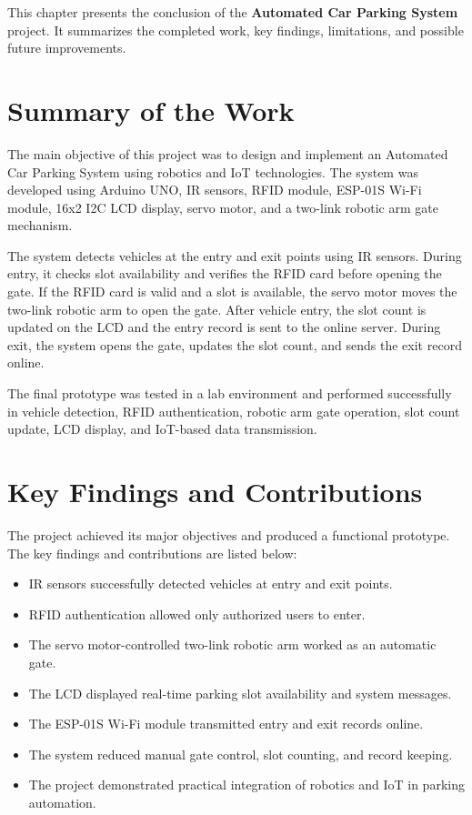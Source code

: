 
\vspace{-0.8cm}

This chapter presents the conclusion of the \textbf{Automated Car Parking System} project. It summarizes the completed work, key findings, limitations, and possible future improvements.

\section{Summary of the Work}

The main objective of this project was to design and implement an Automated Car Parking System using robotics and IoT technologies. The system was developed using Arduino UNO, IR sensors, RFID module, ESP-01S Wi-Fi module, 16x2 I2C LCD display, servo motor, and a two-link robotic arm gate mechanism.

The system detects vehicles at the entry and exit points using IR sensors. During entry, it checks slot availability and verifies the RFID card before opening the gate. If the RFID card is valid and a slot is available, the servo motor moves the two-link robotic arm to open the gate. After vehicle entry, the slot count is updated on the LCD and the entry record is sent to the online server. During exit, the system opens the gate, updates the slot count, and sends the exit record online.

The final prototype was tested in a lab environment and performed successfully in vehicle detection, RFID authentication, robotic arm gate operation, slot count update, LCD display, and IoT-based data transmission.

\section{Key Findings and Contributions}

The project achieved its major objectives and produced a functional prototype. The key findings and contributions are listed below:

\begin{itemize}
    \item IR sensors successfully detected vehicles at entry and exit points.
    \item RFID authentication allowed only authorized users to enter.
    \item The servo motor-controlled two-link robotic arm worked as an automatic gate.
    \item The LCD displayed real-time parking slot availability and system messages.
    \item The ESP-01S Wi-Fi module transmitted entry and exit records online.
    \item The system reduced manual gate control, slot counting, and record keeping.
    \item The project demonstrated practical integration of robotics and IoT in parking automation.
\end{itemize}

